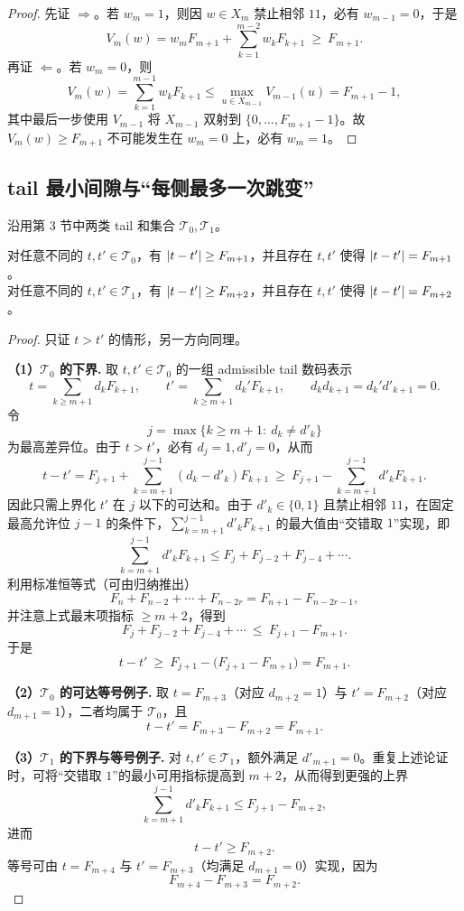 \begin{proof}
先证 $\Rightarrow$。若 $w_m=1$，则因 $w\in X_m$ 禁止相邻 $11$，必有 $w_{m-1}=0$，于是
$$
V_m(w)=w_mF_{m+1}+\sum_{k=1}^{m-2} w_kF_{k+1}\ \ge\ F_{m+1}.
$$
再证 $\Leftarrow$。若 $w_m=0$，则
$$
V_m(w)=\sum_{k=1}^{m-1} w_kF_{k+1}\le \max_{u\in X_{m-1}} V_{m-1}(u)=F_{m+1}-1,
$$
其中最后一步使用 $V_{m-1}$ 将 $X_{m-1}$ 双射到 $\{0,\dots,F_{m+1}-1\}$。故 $V_m(w)\ge F_{m+1}$ 不可能发生在 $w_m=0$ 上，必有 $w_m=1$。
\end{proof}

\subsection{tail 最小间隙与“每侧最多一次跳变”}

沿用第 3 节中两类 tail 和集合 $\mathcal{T}_0,\mathcal{T}_1$。

\begin{lemma}
对任意不同的 $t,t'\in\mathcal{T}_0$，有 $\left\lvert t-t'\right\rvert\ge F_{m+1}$，并且存在 $t,t'$ 使得 $\left\lvert t-t'\right\rvert=F_{m+1}$。\\
对任意不同的 $t,t'\in\mathcal{T}_1$，有 $\left\lvert t-t'\right\rvert\ge F_{m+2}$，并且存在 $t,t'$ 使得 $\left\lvert t-t'\right\rvert=F_{m+2}$。
\end{lemma}

\begin{proof}
只证 $t>t'$ 的情形，另一方向同理。

\textbf{（1）$\mathcal{T}_0$ 的下界.}
取 $t,t'\in\mathcal{T}_0$ 的一组 admissible tail 数码表示
$$
t=\sum_{k\ge m+1} d_kF_{k+1},\qquad
t'=\sum_{k\ge m+1} d_k'F_{k+1},\qquad d_kd_{k+1}=d_k'd'_{k+1}=0.
$$
令
$$
j=\max\{k\ge m+1:\ d_k\ne d'_k\}
$$
为最高差异位。由于 $t>t'$，必有 $d_j=1,d'_j=0$，从而
$$
t-t'=F_{j+1}+\sum_{k=m+1}^{j-1}(d_k-d'_k)F_{k+1}
\ \ge\ F_{j+1}-\sum_{k=m+1}^{j-1} d'_kF_{k+1}.
$$
因此只需上界化 $t'$ 在 $j$ 以下的可达和。由于 $d'_k\in\{0,1\}$ 且禁止相邻 $11$，在固定最高允许位 $j-1$ 的条件下，$\sum_{k=m+1}^{j-1} d'_kF_{k+1}$ 的最大值由“交错取 $1$”实现，即
$$
\sum_{k=m+1}^{j-1} d'_kF_{k+1}\le F_j+F_{j-2}+F_{j-4}+\cdots.
$$
利用标准恒等式（可由归纳推出）
$$
F_n+F_{n-2}+\cdots+F_{n-2r}=F_{n+1}-F_{n-2r-1},
$$
并注意上式最末项指标 $\ge m+2$，得到
$$
F_j+F_{j-2}+F_{j-4}+\cdots \ \le\ F_{j+1}-F_{m+1}.
$$
于是
$$
t-t'\ \ge\ F_{j+1}-\big(F_{j+1}-F_{m+1}\big)=F_{m+1}.
$$

\textbf{（2）$\mathcal{T}_0$ 的可达等号例子.}
取 $t=F_{m+3}$（对应 $d_{m+2}=1$）与 $t'=F_{m+2}$（对应 $d_{m+1}=1$），二者均属于 $\mathcal{T}_0$，且
$$
t-t'=F_{m+3}-F_{m+2}=F_{m+1}.
$$

\textbf{（3）$\mathcal{T}_1$ 的下界与等号例子.}
对 $t,t'\in\mathcal{T}_1$，额外满足 $d'_{m+1}=0$。重复上述论证时，可将“交错取 $1$”的最小可用指标提高到 $m+2$，从而得到更强的上界
$$
\sum_{k=m+1}^{j-1} d'_kF_{k+1}\le F_{j+1}-F_{m+2},
$$
进而
$$
t-t'\ge F_{m+2}.
$$
等号可由 $t=F_{m+4}$ 与 $t'=F_{m+3}$（均满足 $d_{m+1}=0$）实现，因为
$$
F_{m+4}-F_{m+3}=F_{m+2}.
$$
\end{proof}

